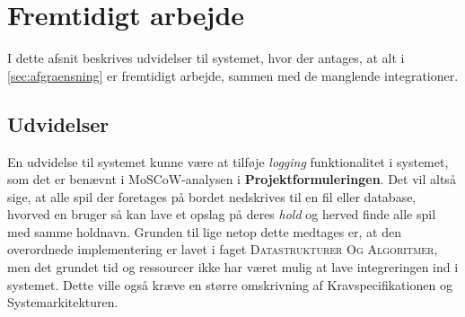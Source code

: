 \documentclass[Rapport/Rapport_main.tex]{subfiles}
\begin{document}
\section{Fremtidigt arbejde}
I dette afsnit beskrives udvidelser til systemet, hvor der antages, at alt i \ref{sec:afgraensning} er fremtidigt arbejde, sammen med de manglende integrationer.

\subsection{Udvidelser}
En udvidelse til systemet kunne være at tilføje \textit{logging} funktionalitet i systemet, som det er benævnt i MoSCoW-analysen i \textbf{Projektformuleringen}. Det vil altså sige, at alle spil der foretages på bordet nedskrives til en fil eller database, hvorved en bruger så kan lave et opslag på deres \textit{hold} og herved finde alle spil med samme holdnavn. Grunden til lige netop dette medtages er, at den overordnede implementering er lavet i faget \textsc{Datastrukturer Og Algoritmer}, men det grundet tid og ressourcer ikke har været mulig at lave integreringen ind i systemet. Dette ville også kræve en større omskrivning af Kravspecifikationen og Systemarkitekturen.
\end{document}
